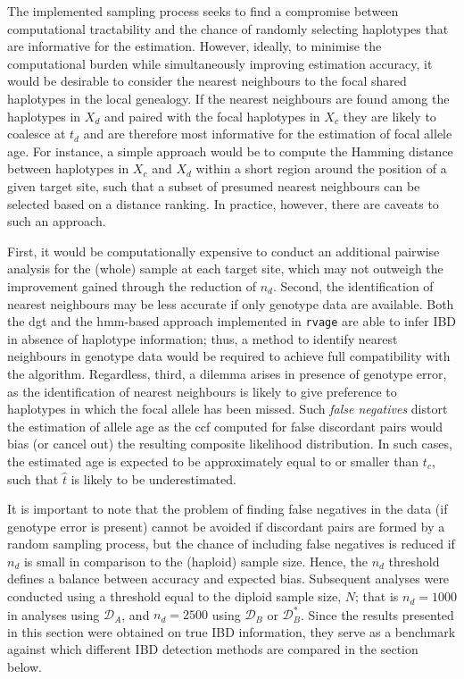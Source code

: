 The implemented sampling process seeks to find a compromise between computational tractability and the chance of randomly selecting haplotypes that are informative for the estimation.
However, ideally, to minimise the computational burden while simultaneously improving estimation accuracy, it would be desirable to consider the nearest neighbours to the focal shared haplotypes in the local genealogy.
If the nearest neighbours are found among the haplotypes in $X_d$ and paired with the focal haplotypes in $X_c$ they are likely to coalesce at $t_d$ and are therefore most informative for the estimation of focal allele age.
For instance, a simple approach would be to compute the Hamming distance between haplotypes in $X_c$ and $X_d$ within a short region around the position of a given target site, such that a subset of presumed nearest neighbours can be selected based on a distance ranking.
In practice, however, there are  caveats to such an approach.

First, it would be computationally expensive to conduct an additional pairwise analysis for the (whole) sample at each target site, which may not outweigh the improvement gained through the reduction of $n_d$.
Second, the identification of nearest neighbours may be less accurate if only genotype data are available.
Both the \gls{dgt} and the \gls{hmm}-based approach implemented in \texttt{rvage} are able to infer IBD in absence of haplotype information; thus, a method to identify nearest neighbours in genotype data would be required to achieve full compatibility with the algorithm.
Regardless, third, a dilemma arises in presence of genotype error, as the identification of nearest neighbours is likely to give preference to haplotypes in which the focal allele has been missed.
\label{p:falseneg}%
Such \emph{false negatives} distort the estimation of allele age as the \gls{ccf}
computed for false discordant pairs would bias (or cancel out) the resulting composite likelihood distribution.
In such cases, the estimated age is expected to be approximately equal to or smaller than $t_c$, such that $\hat{t}$ is likely to be underestimated.

It is important to note that the problem of finding false negatives in the data (if genotype error is present) cannot be avoided if discordant pairs are formed by a random sampling process, but the chance of including false negatives is reduced if $n_d$ is small in comparison to the (haploid) sample size.
Hence, the $n_d$ threshold defines a balance between accuracy and expected bias.
Subsequent analyses were conducted using a threshold equal to the diploid sample size, $N$; that is ${n_d = \num{1000}}$ in analyses using $\mathcal{D}_A$, and ${n_d = \num{2500}}$ using $\mathcal{D}_B$ or $\mathcal{D}_B^{\ast}$.
Since the results presented in this section were obtained on true IBD information, they serve as a benchmark against which different IBD detection methods are compared in the section below.














